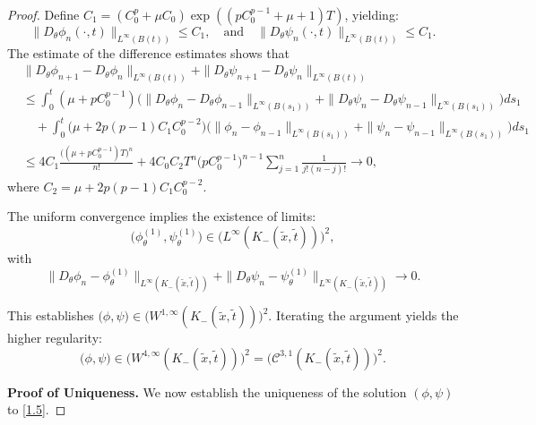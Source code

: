 \documentclass[
  sn-mathphys-num,
  colorlinks,
  linkcolor=darkmagenta,
  citecolor=rufous,
  urlcolor=zaffre,
  hypertexnames=false
]{sn-jnl}
\numberwithin{equation}{section}
\begin{document}
\begin{proof}
\medskip

Define $C_1 = (C_0^p+\mu C_0) \exp((pC_0^{p-1}+\mu+1) T)$, yielding:
\begin{equation}
\|D_\theta \phi_n(\cdot, t)\|_{L^\infty(B(t))} \leq C_1, \quad \text{and} \quad \|D_\theta \psi_n(\cdot, t)\|_{L^\infty(B(t))} \leq C_1.
\label{eq:2.8}
\end{equation}
The estimate of the difference estimates shows that
\begin{equation}
\begin{aligned}
&\|D_\theta \phi_{n+1} - D_\theta \phi_n\|_{L^\infty(B(t))} + \|D_\theta \psi_{n+1} - D_\theta \psi_n\|_{L^\infty(B(t))} \\
&\leq \int_0^t (\mu + p C_0^{p-1}) \big(\|D_\theta \phi_n - D_\theta \phi_{n-1}\|_{L^\infty(B(s_1))} + \|D_\theta \psi_n - D_\theta \psi_{n-1}\|_{L^\infty(B(s_1))}\big) ds_1 \\
&\quad + \int_0^t \big(\mu + 2p(p - 1) C_1 C_0^{p-2}\big) \big(\|\phi_n - \phi_{n-1}\|_{L^\infty(B(s_1))} + \|\psi_n - \psi_{n-1}\|_{L^\infty(B(s_1))}\big) ds_1 \\
&\leq 4C_1 \frac{\big((\mu + p C_0^{p-1}) T\big)^n}{n!} + 4 C_0 C_2 T^n \big(p C_0^{p-1}\big)^{n-1} \sum_{j=1}^n \frac{1}{j! (n - j)!} \to 0,
\end{aligned}
\label{eq:2.91}
\end{equation}
where $C_2 = \mu+2p(p - 1)C_1C_0^{p-2}$.

\medskip

The uniform convergence implies the existence of limits:
$$
\big(\phi_\theta^{(1)}, \psi_\theta^{(1)}\big) \in \big(L^\infty(K_-(\tilde{x}, \tilde{t}))\big)^2,
$$
with
$$
\|D_\theta \phi_n - \phi_\theta^{(1)}\|_{L^\infty(K_-(\tilde{x}, \tilde{t}))} + \|D_\theta \psi_n - \psi_\theta^{(1)}\|_{L^\infty(K_-(\tilde{x}, \tilde{t}))} \to 0.
$$

This establishes $\big(\phi, \psi\big) \in \big(W^{1, \infty}(K_-(\tilde{x}, \tilde{t}))\big)^2$. Iterating the argument yields the higher regularity:
$$
\big(\phi, \psi\big) \in \big(W^{4, \infty}(K_-(\tilde{x}, \tilde{t}))\big)^2 = \big(\mathcal{C}^{3, 1}(K_-(\tilde{x}, \tilde{t}))\big)^2.
$$


\noindent\textbf{Proof of Uniqueness.}
We now establish the uniqueness of the solution $(\phi, \psi)$ to \eqref{1.5}. 
 

\end{proof}
\end{document}

